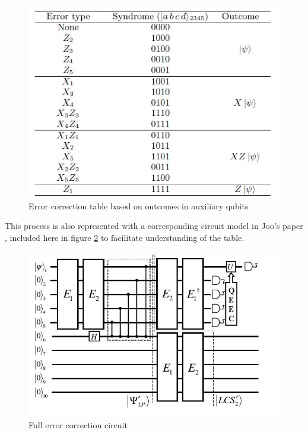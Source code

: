 \begin{figure}
\centering
\includegraphics[scale=0.75]{gfx/error_table.JPG}
\caption{Error correction table based on outcomes in auxiliary qubits \citep{joo_error-correcting_2009}}
\label{fig:m_table}
\end{figure}

This process is also represented with a corresponding circuit model in Joo's paper \citep{joo_error-correcting_2009}, included here in figure \ref{fig:m_circuit} to facilitate understanding of the table.

\begin{figure}
\centering
\includegraphics[scale=0.75]{gfx/error_circuit.JPG}
\caption{Full error correction circuit \citep{joo_error-correcting_2009}}
\label{fig:m_circuit}
\end{figure}

